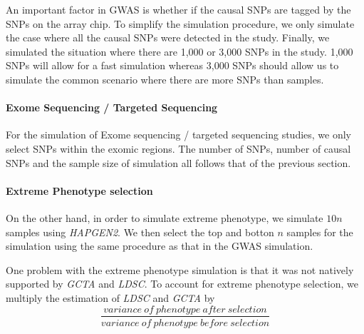 An important factor in GWAS is whether if the causal SNPs are tagged by the SNPs on the array chip. 
To simplify the simulation procedure, we only simulate the case where all the causal SNPs were detected in the study.
Finally, we simulated the situation where there are 1,000 or 3,000 SNPs in the study.
1,000 SNPs will allow for a fast simulation whereas 3,000 SNPs should allow us to simulate the common scenario where there are more SNPs than samples.



\paragraph{Exome Sequencing / Targeted Sequencing}
For the simulation of Exome sequencing / targeted sequencing studies, we only select SNPs within the exomic regions. 
The number of SNPs, number of causal SNPs and the sample size of simulation all follows that of the previous section.

\paragraph{Extreme Phenotype selection}
On the other hand, in order to simulate extreme phenotype, we simulate $10n$ samples using \textit{HAPGEN2}.
We then select the top and botton $n$ samples for the simulation using the same procedure as that in the GWAS simulation.

One problem with the extreme phenotype simulation is that it was not natively supported by \textit{GCTA} and \textit{LDSC}. 
To account for extreme phenotype selection, we multiply the estimation of \textit{LDSC} and \textit{GCTA} by 
$$
\frac{variance\ of\ phenotype\ after\ selection}{variance\ of\ phenotype\ before\ selection}
$$
